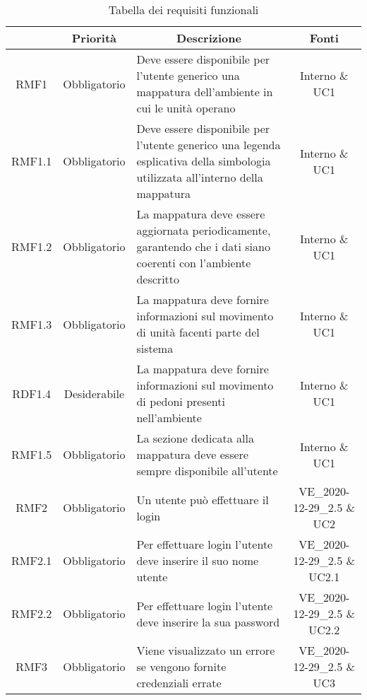 	\newcommand*{\thead}[1]{\multicolumn{1}{c}{\bfseries #1}}
	\setlength{\tabcolsep}{10pt}
	\begin{longtable}[h!] { c c m{8cm} c}
		\caption{Tabella dei requisiti funzionali} \\
		\rowcolor{lightgray}
		\thead{Requisito} & \thead{Priorità} & \thead{Descrizione} & \thead{Fonti} \\ \endhead%

		RMF1 & Obbligatorio & Deve essere disponibile per l'utente generico una mappatura dell'ambiente in cui le unità operano & Interno \& UC1 \\

		RMF1.1 & Obbligatorio & Deve essere disponibile per l'utente generico una legenda esplicativa della simbologia utilizzata all'interno della mappatura & Interno \& UC1 \\

		RMF1.2 & Obbligatorio & La mappatura deve essere aggiornata periodicamente, garantendo che i dati siano coerenti con l'ambiente descritto & Interno \& UC1 \\

		RMF1.3 & Obbligatorio & La mappatura deve fornire informazioni sul movimento di unità facenti parte del sistema & Interno \& UC1 \\

		RDF1.4 & Desiderabile & La mappatura deve fornire informazioni sul movimento di pedoni presenti nell'ambiente & Interno \& UC1 \\

		RMF1.5 & Obbligatorio & La sezione dedicata alla mappatura deve essere sempre disponibile all'utente & Interno \& UC1 \\

		RMF2 & Obbligatorio & Un utente può effettuare il login & VE_2020-12-29_2.5 \& UC2 \\

		RMF2.1 & Obbligatorio & Per effettuare login l'utente deve inserire il suo nome utente & VE_2020-12-29_2.5 \& UC2.1 \\

		RMF2.2 & Obbligatorio & Per effettuare login l'utente deve inserire la sua password & VE_2020-12-29_2.5 \& UC2.2 \\

		RMF3 & Obbligatorio & Viene visualizzato un errore se vengono fornite credenziali errate & VE_2020-12-29_2.5 \& UC3 \\


\end{longtable}
